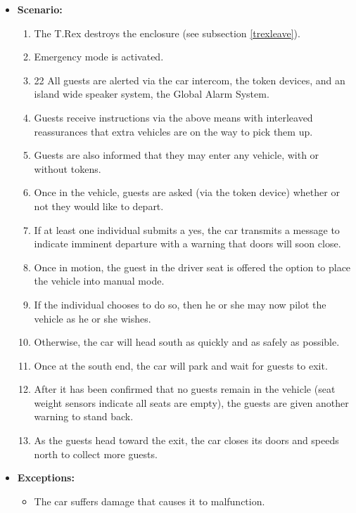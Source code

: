 \documentclass[12pt]{article}
\begin{document}
\begin{itemize}
        \item[]\textbf{Scenario:}
            \begin{enumerate}
                \item The T.Rex destroys the enclosure (see subsection \ref{trexleave}).
                \item Emergency mode is activated.
                \item22 All guests are alerted via the car intercom, the token devices, and an
                island wide speaker system, the Global Alarm System.
                \item Guests receive instructions via the above means with interleaved reassurances
                that extra vehicles are on the way to pick them up.
                \item Guests are also informed that they may enter any vehicle, with or without tokens.
                \item Once in the vehicle, guests are asked (via the token device) whether or not
                they would like to depart.
                \item If at least one individual submits a yes, the car transmits a message to indicate
                imminent departure with a warning that doors will soon close.
                \item Once in motion, the guest in the driver seat is offered the option to place the vehicle into
                manual mode.
                \item If the individual chooses to do so, then he or she may now pilot the vehicle as he or she wishes.
                \item Otherwise, the car will head south as quickly and as safely as possible.
                \item Once at the south end, the car will park and wait for guests to exit.
                \item After it has been confirmed that no guests remain in the vehicle (seat weight sensors
                indicate all seats are empty), the guests are given another warning to stand back.
                \item As the guests head toward the exit, the car closes its doors and speeds north 
                to collect more guests.
            \end{enumerate}

        \item[]\textbf{Exceptions:}
            \begin{itemize}
                \item[] The car suffers damage that causes it to malfunction.
            \end{itemize}


\end{itemize}
\end{document}
